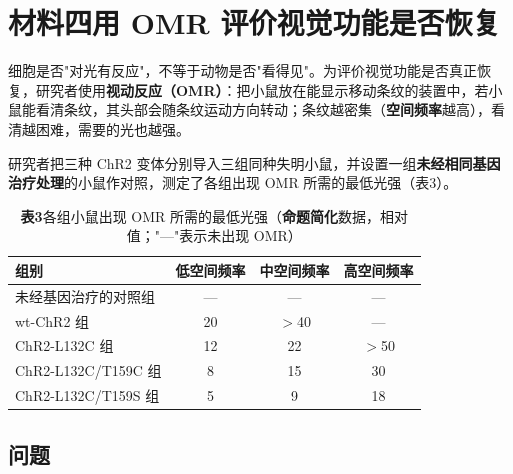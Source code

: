 \documentclass[UTF8,a4paper,11pt]{ctexart}
\newcommand{\key}[1]{\textbf{\color{deepred}#1}}
\begin{document}
\section{材料四\quad 用 OMR 评价视觉功能是否恢复}

细胞是否"对光有反应"，不等于动物是否"看得见"。为评价视觉功能是否真正恢复，研究者使用\textbf{视动反应（OMR）}：把小鼠放在能显示移动条纹的装置中，若小鼠能看清条纹，其头部会随条纹运动方向转动；条纹越密集（\textbf{空间频率}越高），看清越困难，需要的光也越强。

研究者把三种 ChR2 变体分别导入三组同种失明小鼠，并设置一组\textbf{未经相同基因治疗处理}的小鼠作对照，测定了各组出现 OMR 所需的最低光强（表3）。

\begin{table}[H]
\centering\small
\caption*{\textbf{表3}\quad 各组小鼠出现 OMR 所需的最低光强（\key{命题简化}数据，相对值；"—"表示未出现 OMR）}
\begin{tabular}{@{}lccc@{}}
\toprule
\textbf{组别} & \textbf{低空间频率} & \textbf{中空间频率} & \textbf{高空间频率} \\
\midrule
未经基因治疗的对照组 & — & — & — \\
wt-ChR2 组 & 20 & $>$40 & — \\
ChR2-L132C 组 & 12 & 22 & $>$50 \\
ChR2-L132C/T159C 组 & 8 & 15 & 30 \\
ChR2-L132C/T159S 组 & 5 & 9 & 18 \\
\bottomrule
\end{tabular}
\end{table}

\subsection*{问题}
\end{document}
